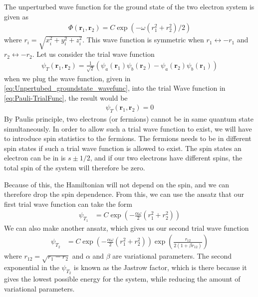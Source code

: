 \documentclass[12pt]{article}
\begin{document}
The unperturbed wave function for the ground state of the two electron system is given as
\begin{align}
\Phi (\mathbf{r}_1, \mathbf{r}_2) = C\exp(-\omega(r_1^2 + r_2^2)/2)
\label{eq:Unpertubed_groundstate_wavefunc}
\end{align}
where $r_i = \sqrt{x_i^2 + y_i^2 + z_i^2}$. This wave function is symmetric when $r_1 \leftrightarrow -r_1$ and $r_2 \leftrightarrow -r_2$. Let us consider the trial wave function
\begin{align}
\psi_T(\mathbf{r}_1, \mathbf{r}_2) = \frac{1}{\sqrt{2}}\left(\psi_a(\mathbf{r}_1)\psi_b(\mathbf{r}_2)- \psi_a(\mathbf{r}_2)\psi_b(\mathbf{r}_1)  \right) 
\label{eq:Pauli-TrialFunc}
\end{align}
when we plug the wave function, given in \ref{eq:Unpertubed_groundstate_wavefunc}, into the trial Wave function in \ref{eq:Pauli-TrialFunc}, the result would be
\begin{align*}
\psi_T(\mathbf{r}_1, \mathbf{r}_2) = 0
\end{align*}
By Paulis principle, two electrons (or fermions) cannot be in same quantum state simultaneously. In order to allow such a trial wave function to exist, we will have to introduce spin statistics to the fermions. The fermions needs to be in different spin states if such a trial wave function is allowed to exist. The spin states an electron can be in is $s\pm 1/2$, and if our two electrons have different spins, the total spin of the system will therefore be zero.

Because of this, the Hamiltonian will not depend on the spin, and we can therefore drop the spin dependence. From this, we can use the ansatz that our first trial wave function can take the form 
\begin{align}
\psi_{T_1} &= C \exp\left(-\frac{\alpha \omega}{2}(r^2_1 + r^2_2)\right)
\label{eq:First_TrialFunc}
\end{align}
We can also make another ansatz, which gives us our second trial wave function
\begin{align}
\psi_{T_2} &= C \exp\left(-\frac{\alpha \omega}{2}(r^2_1 + r^2_2)\right)\exp\left(\frac{r_{12}}{2(1+\beta r_{12})}\right)
\label{eq:Second_TrialFunc}
\end{align}
where $r_{12} = \sqrt{r_1 - r_2}$ and $\alpha$ and $\beta$ are variational parameters. The second exponential in the $\psi_{T_2}$ is known as the Jastrow factor, which is there because it gives the lowest possible energy for the system, while reducing the amount of variational parameters.
\end{document}

